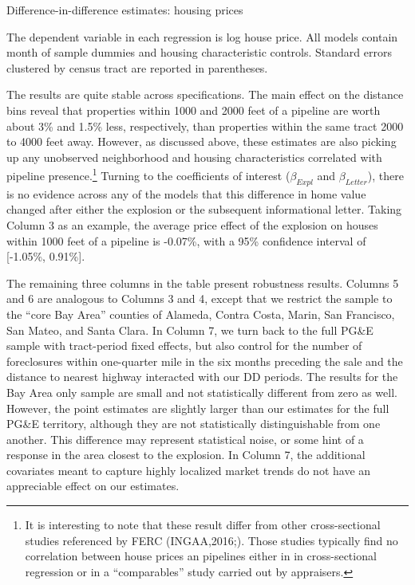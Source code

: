\documentclass[12pt]{article}
\begin{document}
\begin{table}[tbh]
\caption{Difference-in-difference estimates: housing prices\label{tab:pgeddbase}}

\footnotesize
\begin{centering}

\par\end{centering}
\scriptsize

The dependent variable in each regression is log house price. All models contain month of sample dummies and housing characteristic controls. Standard errors clustered by census tract are reported in parentheses. 
\end{table}

The results are quite stable across specifications. The main effect on the distance bins reveal that properties within 1000 and 2000 feet of a pipeline are worth about 3\% and 1.5\% less, respectively, than properties within the same tract 2000 to 4000 feet away. However, as discussed above, these estimates are also picking up any unobserved neighborhood and housing characteristics correlated with pipeline presence.\footnote{It is interesting to note that these result differ from other cross-sectional studies referenced by FERC (INGAA,2016\nocite{interstate_natural_gas_association_of_america_pipeline_2016};\citealp{fruits_impact_2008}). Those studies typically find no correlation between house prices an pipelines either in in cross-sectional regression or in a ``comparables'' study carried out by appraisers. } Turning to the coefficients of interest ($\beta_{Expl}$ and \textbf{$\beta_{Letter}$}), there is no evidence across any of the models that this difference in home value changed after either the explosion or the subsequent informational letter. Taking Column 3 as an example, the average price effect of the explosion on houses within 1000 feet of a pipeline is -0.07\%, with a 95\% confidence interval of {[}-1.05\%, 0.91\%{]}. 

The remaining three columns in the table present robustness results. Columns 5 and 6 are analogous to Columns 3 and 4, except that we restrict the sample to the ``core Bay Area'' counties of Alameda, Contra Costa, Marin, San Francisco, San Mateo, and Santa Clara. In Column 7, we turn back to the full PG\&E sample with tract-period fixed effects, but also control for the number of foreclosures within one-quarter mile in the six months preceding the sale and the distance to nearest highway interacted with our DD periods. The results for the Bay Area only sample are small and not statistically different from zero as well. However, the point estimates are slightly larger than our estimates for the full PG\&E territory, although they are not statistically distinguishable from one another. This difference may represent statistical noise, or some hint of a response in the area closest to the explosion. In Column 7, the additional covariates meant to capture highly localized market trends do not have an appreciable effect on our estimates.
\end{document}
